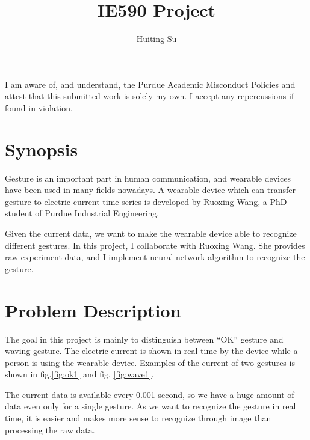 \documentclass[format=acmsmall,review=false, screen=true, authorversion=true]{acmart}
\begin{document}
\title{IE590 Project}  
\author{Huiting Su}
\maketitle


I am aware of, and understand, the Purdue Academic Misconduct Policies
and attest that this submitted work is solely my own. I accept any repercussions if found in violation.

\section{Synopsis}
Gesture is an important part in human communication, and wearable devices have been used in many fields nowadays. A wearable device which can transfer gesture to electric current time series is developed by Ruoxing Wang, a PhD student of Purdue Industrial Engineering. 

Given the current data, we want to make the wearable device able to recognize different gestures. In this project, I collaborate with Ruoxing Wang. She provides raw experiment data, and I implement neural network algorithm to recognize the gesture. 

\section{Problem Description}
The goal in this project is mainly to distinguish between ``OK'' gesture and waving gesture. The electric current is shown in real time by the device while a person is using the wearable device. Examples of the current of two gestures is shown in fig.\ref{fig:ok1} and fig. \ref{fig:wave1}. 

The current data is available every 0.001 second, so we have a huge amount of data even only for a single gesture. As we want to recognize the gesture in real time, it is easier and makes more sense to recognize through image than processing the raw data.     
\end{document}
